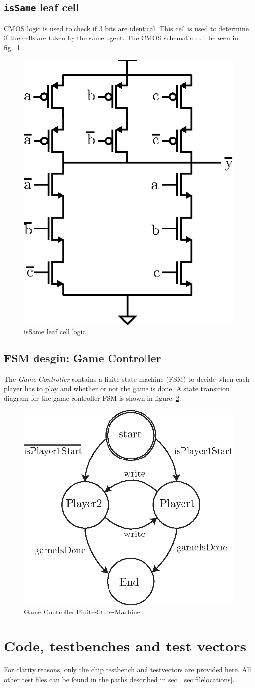 \documentclass[]{article}
\begin{document}
\subsection{\texttt{isSame} leaf cell}
\label{sec:isSame}
CMOS logic is used to check if 3 bits are identical. This cell is used to determine if the cells are taken by the same agent. The CMOS schematic can be seen in fig.~\ref{fig:isSame-cmos}.

\begin{figure}
\centering
\includegraphics[width=.2\textwidth]{isSame-cmos}
\caption{isSame leaf cell logic}
\label{fig:isSame-cmos}
\end{figure}

\subsection{FSM desgin: Game Controller}
The \emph{Game Controller} contains a finite state machine (FSM) to decide when each player has to play and whether or not the game is done. A state transition diagram for the game controller FSM is shown in figure~\ref{fig:gameController-FSM}.

\begin{figure}
\centering
\includegraphics[width=.3\textwidth]{gameController-FSM}
\caption{Game Controller Finite-State-Machine}
\label{fig:gameController-FSM}
\end{figure}


\section{Code, testbenches and test vectors}
For clarity reasons, only the chip testbench and testvectors are provided here. All other test files can be found in the paths described in sec.~\ref{sec:filelocations}.
\end{document}

